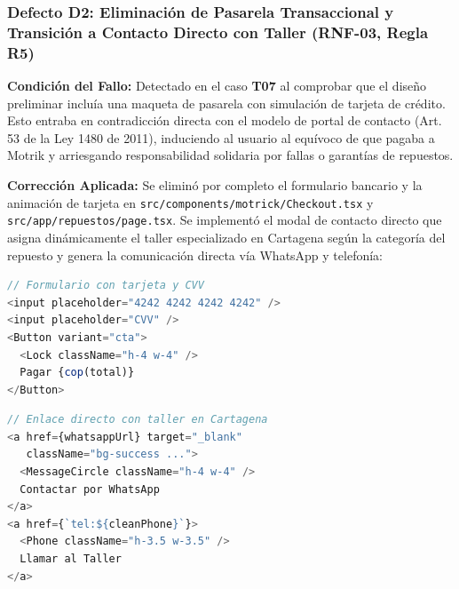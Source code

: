 \documentclass[11pt,letterpaper]{article}
\begin{document}
\vspace{0.4cm}

\subsubsection{Defecto D2: Eliminación de Pasarela Transaccional y Transición a Contacto Directo con Taller (RNF-03, Regla R5)}
\textbf{Condición del Fallo:} Detectado en el caso \textbf{T07} al comprobar que el diseño preliminar incluía una maqueta de pasarela con simulación de tarjeta de crédito. Esto entraba en contradicción directa con el modelo de portal de contacto (Art. 53 de la Ley 1480 de 2011), induciendo al usuario al equívoco de que pagaba a Motrik y arriesgando responsabilidad solidaria por fallas o garantías de repuestos.

\textbf{Corrección Aplicada:} Se eliminó por completo el formulario bancario y la animación de tarjeta en \texttt{src/components/motrick/Checkout.tsx} y \texttt{src/app/repuestos/page.tsx}. Se implementó el modal de contacto directo que asigna dinámicamente el taller especializado en Cartagena según la categoría del repuesto y genera la comunicación directa vía WhatsApp y telefonía:

\begin{minipage}[t]{0.48\textwidth}
\begin{diffbeforebox}
\begin{lstlisting}[language=JavaScript]
// Formulario con tarjeta y CVV
<input placeholder="4242 4242 4242 4242" />
<input placeholder="CVV" />
<Button variant="cta">
  <Lock className="h-4 w-4" /> 
  Pagar {cop(total)}
</Button>
\end{lstlisting}
\end{diffbeforebox}
\end{minipage}
\hfill
\begin{minipage}[t]{0.48\textwidth}
\begin{diffafterbox}
\begin{lstlisting}[language=JavaScript]
// Enlace directo con taller en Cartagena
<a href={whatsappUrl} target="_blank"
   className="bg-success ...">
  <MessageCircle className="h-4 w-4" /> 
  Contactar por WhatsApp
</a>
<a href={`tel:${cleanPhone}`}>
  <Phone className="h-3.5 w-3.5" /> 
  Llamar al Taller
</a>
\end{lstlisting}
\end{diffafterbox}
\end{minipage}

\newpage
\end{document}
